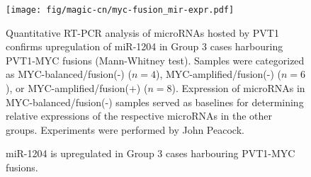\documentclass[11pt,letterpaper]{article}
\theoremstyle{definition}
\begin{document}
\begin{figure}[h]
	\begin{center}
		\texttt{[image: fig/magic-cn/myc-fusion\_mir-expr.pdf]}
	\end{center}
	\caption{miR-1204 is upregulated in Group 3 cases harbouring PVT1-MYC fusions.}
	Quantitative RT-PCR analysis of microRNAs hosted by PVT1 confirms upregulation of miR-1204 in Group 3 cases harbouring PVT1-MYC fusions (Mann-Whitney test). Samples were categorized as MYC-balanced/fusion(-) ($n = 4$), MYC-amplified/fusion(-) ($n = 6$), or MYC-amplified/fusion(+) ($n = 8$). Expression of microRNAs in MYC-balanced/fusion(-) samples served as baselines for determining relative expressions of the respective microRNAs in the other groups. Experiments were performed by John Peacock.
	\label{fig:myc-fusion_mir-expr}
\end{figure}




\clearpage

\begin{multicols}{2}
\small
{}
\end{multicols}

\clearpage

\end{document}

